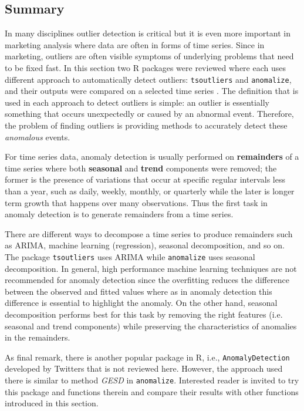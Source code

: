 \subsection{Summary}
In many disciplines outlier detection is critical but it is even more important in marketing analysis where data are often in forms of time series.  Since in marketing, outliers are often visible symptoms of underlying problems that need to be fixed fast. In this section two R packages were reviewed where each uses different approach to automatically detect outliers: \verb|tsoutliers| and \verb|anomalize|, and their outputs were compared on a selected time series . The definition that is used in each approach to detect outliers is simple: an outlier is essentially something that occurs unexpectedly or caused by an abnormal event. Therefore, the problem of finding outliers is providing methods to accurately detect these \textit{anomalous} events. \par For time series data, anomaly detection is usually performed on \textbf{remainders} of a time series where both \textbf{seasonal} and \textbf{trend} components were removed; the former is the presence of variations that occur at specific regular intervals less than a year, such as daily, weekly, monthly, or quarterly while the later is longer term growth that happens over many observations. Thus the first task in anomaly detection is to generate remainders from a time series. \par There are different ways to decompose a time series to produce remainders such as ARIMA, machine learning (regression), seasonal decomposition, and so on. The package \verb|tsoutliers| uses ARIMA while \verb|anomalize| uses seasonal decomposition. In general, high performance machine learning techniques are not recommended for anomaly detection since the overfitting reduces the difference between the observed and fitted values where as in anomaly detection this difference is essential to highlight the anomaly. On the other hand, seasonal decomposition performs best for this task by removing the right features (i.e. seasonal and trend components) while preserving the characteristics of anomalies in the remainders. \par As final remark, there is another popular package in R, i.e., \verb|AnomalyDetection| developed by Twitters that is not reviewed here. However, the approach used there is similar to method \textit{GESD} in \verb|anomalize|. Interested reader is invited to try this package and functions therein and compare their results with other functions introduced in this section. 

